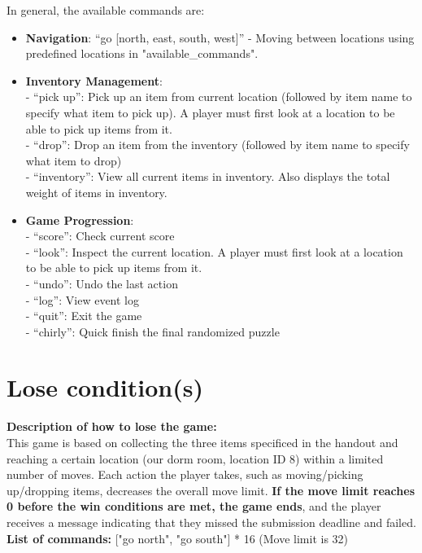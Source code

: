 \documentclass[11pt]{article}
\begin{document}
In general, the available commands are:
\begin{itemize}
    \item \textbf{Navigation}: ``go [north, east, south, west]'' - Moving between locations using predefined locations in "available\_commands".
    \item \textbf{Inventory Management}:\\
    - ``pick up'': Pick up an item from current location (followed by item name to specify what item to pick up). A player must first look at a location to be able to pick up items from it.\\
    - ``drop'': Drop an item from the inventory (followed by item name to specify what item to drop)\\
    - ``inventory'': View all current items in inventory. Also displays the total weight of items in inventory.
    \item \textbf{Game Progression}: \\
    - ``score'': Check current score\\
    - ``look'': Inspect the current location. A player must first look at a location to be able to pick up items from it.\\
    - ``undo'': Undo the last action\\
    - ``log'': View event log\\
    - ``quit'': Exit the game\\
    - ``chirly'': Quick finish the final randomized puzzle

\end{itemize}


\section*{Lose condition(s)}
\textbf{Description of how to lose the game:} \\
    This game is based on collecting the three items specificed in the handout and reaching a certain location (our dorm room, location ID 8) within a limited number of moves. Each action the player takes, such as moving/picking up/dropping items, decreases the overall move limit. \textbf{If the move limit reaches 0 before the win conditions are met, the game ends}, and the player receives a message indicating that they missed the submission deadline and failed. \\


\textbf{List of commands:} ["go north", "go south"] * 16 (Move limit is 32)
\end{document}
